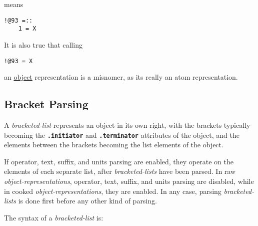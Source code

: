 \documentclass[12pt]{article}
\newcommand{\TT}[1]{{\tt \bfseries #1}}
\newenvironment{indpar}[1][0.3in]%
	{\begin{list}{}%
		     {\setlength{\itemsep}{0in}%
		      \setlength{\topsep}{0in}%
		      \setlength{\parsep}{1ex}%
		      \setlength{\labelwidth}{#1}%
		      \setlength{\leftmargin}{#1}%
		      \addtolength{\leftmargin}{\labelsep}}%
	 \item}%
	{\end{list}}
\begin{document}
means

\begin{indpar}\begin{verbatim}
!@93 =::
    1 = X
\end{verbatim}\end{indpar}

It is also true that calling

\begin{indpar}\begin{verbatim}
!@93 = X
\end{verbatim}\end{indpar}

an \underline{object} representation is a misnomer, as its
really an atom representation.

\subsection{Bracket Parsing}
\label{BRACKET-PARSING}

A {\em bracketed-list} represents an object in its own right,
with the brackets typically
becoming the \TT{.initia\-tor} and \TT{.termina\-tor}
attributes of the object, and the elements between the brackets
becoming the list elements of the object.

If operator, text, suffix,
and units parsing are enabled, they operate on the elements of each
separate list, after {\em bracketed-lists} have been parsed.
In raw {\em object-representations}, operator, text, suffix, and
units parsing are disabled, while in cooked {\em object-representations},
they are enabled.  In any case, parsing {\em bracketed-lists} is done
first before any other kind of parsing.

The syntax of a {\em bracketed-list} is:
\end{document}
